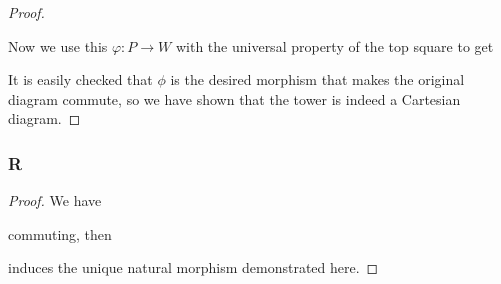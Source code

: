 \documentclass{article}
\begin{document}
\begin{proof}
\begin{center}
    \end{center}
    Now we use this $\varphi:P\to W$ with the universal property of the top square to get
    \begin{center}
    \end{center}
    It is easily checked that $\phi$ is the desired morphism that makes the original diagram commute, so we have shown that the tower is indeed a Cartesian diagram.
\end{proof}
\subsubsection{R}\label{1.3.R}
\begin{proof}
    We have
    \begin{center}
    \end{center}
    commuting, then
    \begin{center}
    \end{center}
    induces the unique natural morphism demonstrated here.
\end{proof}
\end{document}
